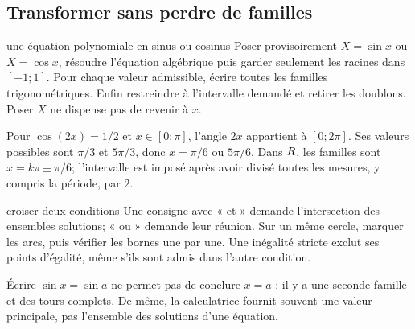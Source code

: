 \subsection*{Transformer sans perdre de familles}
\begin{methode}{une équation polynomiale en sinus ou cosinus}
Poser provisoirement $X=\sin x$ ou $X=\cos x$, résoudre l’équation algébrique puis garder seulement les racines dans $[-1;1]$. Pour chaque valeur admissible, écrire toutes les familles trigonométriques. Enfin restreindre à l’intervalle demandé et retirer les doublons. Poser $X$ ne dispense pas de revenir à $x$.
\end{methode}
\begin{exemple}
Pour $\cos(2x)=1/2$ et $x\in[0;\pi]$, l’angle $2x$ appartient à $[0;2\pi]$. Ses valeurs possibles sont $\pi/3$ et $5\pi/3$, donc $x=\pi/6$ ou $5\pi/6$. Dans $R$, les familles sont $x=k\pi\pm\pi/6$; l’intervalle est imposé après avoir divisé toutes les mesures, y compris la période, par $2$.
\end{exemple}
\begin{methode}{croiser deux conditions}
Une consigne avec « et » demande l’intersection des ensembles solutions; « ou » demande leur réunion. Sur un même cercle, marquer les arcs, puis vérifier les bornes une par une. Une inégalité stricte exclut ses points d’égalité, même s’ils sont admis dans l’autre condition.
\end{methode}
\begin{avertissement}
Écrire $\sin x=\sin a$ ne permet pas de conclure $x=a$ : il y a une seconde famille et des tours complets. De même, la calculatrice fournit souvent une valeur principale, pas l’ensemble des solutions d’une équation.
\end{avertissement}


